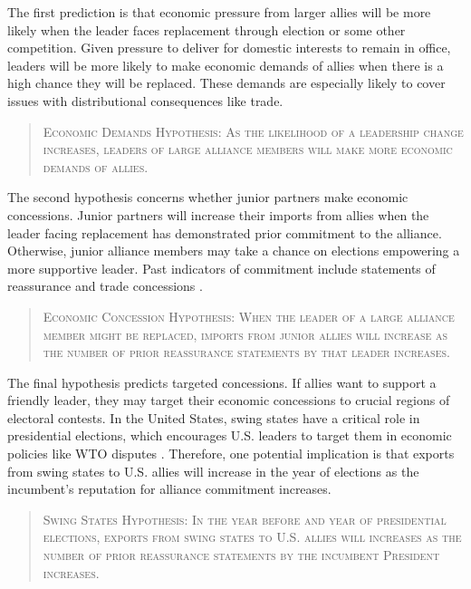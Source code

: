 \documentclass[12pt]{article}
\begin{document}
The first prediction is that economic pressure from larger allies will be more likely when the leader faces replacement through election or some other competition. 
Given pressure to deliver for domestic interests to remain in office, leaders will be more likely to make economic demands of allies when there is a high chance they will be replaced. 
These demands are especially likely to cover issues with distributional consequences like trade.


\begin{quote}
\textsc{Economic Demands Hypothesis: As the likelihood of a leadership change increases, leaders of large alliance members will make more economic demands of allies.}
\end{quote}


The second hypothesis concerns whether junior partners make economic concessions. 
Junior partners will increase their imports from allies when the leader facing replacement has demonstrated prior commitment to the alliance. 
Otherwise, junior alliance members may take a chance on elections empowering a more supportive leader. 
Past indicators of commitment include statements of reassurance \citep{Blankenship2020} and trade concessions \citep{WolfordKim2017}.


\begin{quote}
\textsc{Economic Concession Hypothesis: When the leader of a large alliance member might be replaced, imports from junior allies will increase as the number of prior reassurance statements by that leader increases.}
\end{quote}



The final hypothesis predicts targeted concessions.
If allies want to support a friendly leader, they may target their economic concessions to crucial regions of electoral contests. 
In the United States, swing states have a critical role in presidential elections, which encourages U.S. leaders to target them in economic policies like WTO disputes \citep{Conconietal2017}.
Therefore, one potential implication is that exports from swing states to U.S. allies will increase in the year of elections as the incumbent's reputation for alliance commitment increases.

\begin{quote}
\textsc{Swing States Hypothesis: In the year before and year of presidential elections, exports from swing states to U.S. allies will increases as the number of prior reassurance statements by the incumbent President increases.}
\end{quote}
\end{document}
